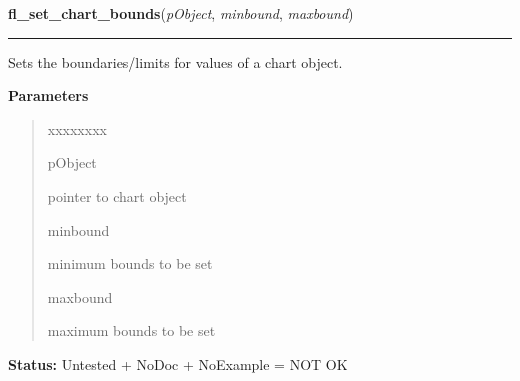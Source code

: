\hspace{.8\funcindent}\begin{boxedminipage}{\funcwidth}

    \raggedright \textbf{fl\_set\_chart\_bounds}(\textit{pObject}, \textit{minbound}, \textit{maxbound})

    \vspace{-1.5ex}

    \rule{\textwidth}{0.5\fboxrule}
\setlength{\parskip}{2ex}
    Sets the boundaries/limits for values of a chart object.

\setlength{\parskip}{1ex}
      \textbf{Parameters}
      \vspace{-1ex}

      \begin{quote}
        \begin{Ventry}{xxxxxxxx}

          \item[pObject]

          pointer to chart object

          \item[minbound]

          minimum bounds to be set

          \item[maxbound]

          maximum bounds to be set

        \end{Ventry}

      \end{quote}

\textbf{Status:} Untested + NoDoc + NoExample = NOT OK



    \end{boxedminipage}

    \label{xformslib:library:fl_get_chart_bounds}

    \vspace{0.5ex}

